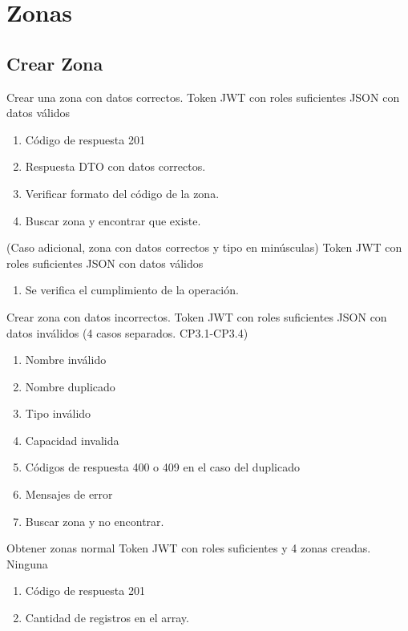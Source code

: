 \section{Zonas}
\subsection{Crear Zona}

{Crear una zona con datos correctos.}
{Token JWT con roles suficientes}
{JSON con datos válidos}
{\begin{enumerate} [leftmargin=*, nosep]
    \item Código de respuesta 201
    \item Respuesta DTO con datos correctos.
    \item Verificar formato del código de la zona.
    \item Buscar zona y encontrar que existe.
\end{enumerate}}

{(Caso adicional, zona con datos correctos y tipo en minúsculas)}
{Token JWT con roles suficientes}
{JSON con datos válidos}
{\begin{enumerate} [leftmargin=*, nosep]
    \item Se verifica el cumplimiento de la operación.
\end{enumerate}}

{Crear zona con datos incorrectos.}
{Token JWT con roles suficientes}
{JSON con datos inválidos (4 casos separados. CP3.1-CP3.4)}
{\begin{enumerate} [leftmargin=*, nosep]
    \item Nombre inválido
    \item Nombre duplicado
    \item Tipo inválido
    \item Capacidad invalida
    \item Códigos de respuesta 400 o 409 en el caso del duplicado
    \item Mensajes de error
    \item Buscar zona y no encontrar.
\end{enumerate}}

{Obtener zonas normal}
{Token JWT con roles suficientes y 4 zonas creadas.}
{Ninguna}
{\begin{enumerate} [leftmargin=*, nosep]
    \item Código de respuesta 201
    \item Cantidad de registros en el array.
\end{enumerate}}

